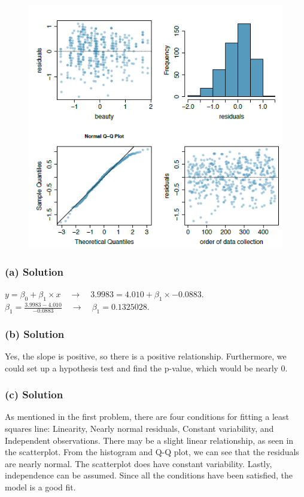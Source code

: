 \documentclass[]{article}
\begin{document}
\begin{figure}
\centering
\includegraphics{7.40b.PNG}
\caption{}
\end{figure}

\subsubsection{(a) Solution}\label{a-solution-3}

\(y = \beta_0 +\beta_1 \times x \quad \to \quad 3.9983 = 4.010 + \beta_1 \times -0.0883\).\\
\(\beta_1 = \frac{3.9983 - 4.010}{-0.0883} \quad \to \quad \beta_1 = 0.1325028\).

\subsubsection{(b) Solution}\label{b-solution-3}

Yes, the slope is positive, so there is a positive relationship.
Furthermore, we could set up a hypothesis test and find the p-value,
which would be nearly 0.

\subsubsection{(c) Solution}\label{c-solution-3}

As mentioned in the first problem, there are four conditions for fitting
a least squares line: Linearity, Nearly normal residuals, Constant
variability, and Independent observations. There may be a slight linear
relationship, as seen in the scatterplot. From the histogram and Q-Q
plot, we can see that the residuals are nearly normal. The scatterplot
does have constant variability. Lastly, independence can be assumed.
Since all the conditions have been satisfied, the model is a good fit.
\end{document}
